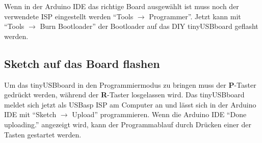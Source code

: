 Wenn in der Arduino IDE das richtige Board ausgewählt ist muss noch der verwendete ISP eingestellt werden \enquote{Tools $\rightarrow$ Programmer}. Jetzt kann mit \enquote{Tools $\rightarrow$ Burn Bootloader} der Bootloader auf das DIY tinyUSBboard geflasht werden.

\subsection{Sketch auf das Board flashen}
Um das tinyUSBboard in den Programmiermodus zu bringen muss der \textbf{P}-Taster gedrückt werden, während der \textbf{R}-Taster losgelassen wird. Das tinyUSBboard meldet sich jetzt als USBasp ISP am Computer an und lässt sich in der Arduino IDE mit \enquote{Sketch $\rightarrow$ Upload} programmieren. Wenn die Arduino IDE \enquote{Done uploading.} angezeigt wird, kann der Programmablauf durch Drücken einer der Tasten gestartet werden. 



